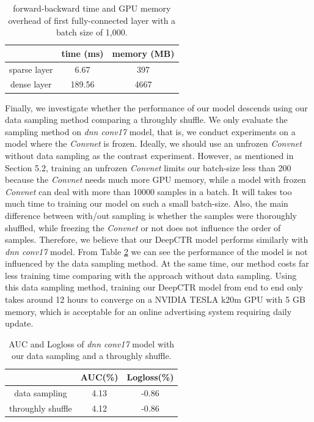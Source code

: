 \documentclass{sig-alternate}
\begin{document}
\begin{table}
	\centering
	\caption{forward-backward time and GPU memory overhead of first fully-connected layer with a batch size of 1,000.}
	\label{table:time&memory}
	\begin{tabular}{|c|c|c|} \hline
		& time (ms) & memory (MB)\\ \hline
		sparse layer & 6.67 &397 \\ \hline
		dense layer & 189.56 &4667 \\ \hline
	\end{tabular}
\end{table}

Finally, we investigate whether the performance of our model descends using our data sampling method comparing a throughly shuffle. We only evaluate the sampling method on  \emph{dnn conv17} model, that is, we conduct experiments on a model where the \emph{Convnet} is frozen. Ideally, we should use an unfrozen \emph{Convnet} without data sampling as the contrast experiment. However, as mentioned in Section 5.2, training an unfrozen \emph{Convnet} limits our batch-size less than 200  because the \emph{Convnet} needs much more GPU memory, while a model with frozen \emph{Convnet} can deal with more than 10000 samples in a batch. It will takes too much time to training our model on such a small batch-size. Also, the main difference between with/out sampling is whether the samples were thoroughly shuffled, while freezing the \emph{Convnet} or not does not influence  the order of samples. Therefore, we believe that our  DeepCTR model performs similarly with \emph{dnn conv17} model. From Table \ref{table:datasampling} we can see the performance of the model is not influenced by the data sampling method. At the same time, our method  costs far less training time comparing with the approach without data sampling. Using this data sampling method, training our DeepCTR model from end to end only takes around 12 hours to converge on a NVIDIA TESLA k20m GPU with 5 GB memory, which is acceptable for an online advertising system requiring daily update. 
\begin{table}
	\centering
	\caption{AUC and Logloss of \emph{dnn conv17} model with our data sampling and a throughly shuffle.}
	\label{table:datasampling}
	\begin{tabular}{|c|c|c|} \hline
		& AUC(\%) & Logloss(\%)\\ \hline
		data sampling & 4.13 & -0.86\\ \hline
		throughly shuffle & 4.12 & -0.86\\ \hline
	\end{tabular}
\end{table}
\end{document}
